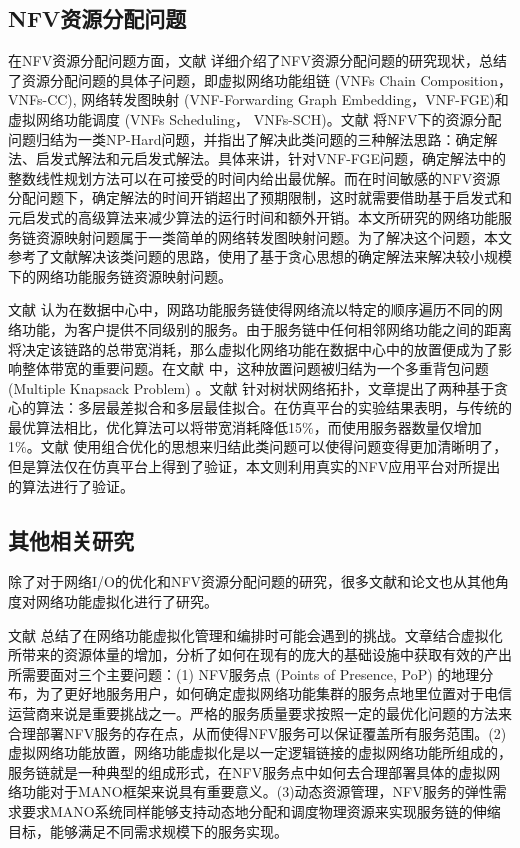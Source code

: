 \subsection{NFV资源分配问题}
在NFV资源分配问题方面，文献  详细介绍了NFV资源分配问题的研究现状，总结了资源分配问题的具体子问题，即虚拟网络功能组链 (VNFs Chain Composition，VNFs-CC), 网络转发图映射 (VNF-Forwarding Graph Embedding，VNF-FGE)和虚拟网络功能调度 (VNFs Scheduling， VNFs-SCH)。文献  将NFV下的资源分配问题归结为一类NP-Hard问题，并指出了解决此类问题的三种解法思路：确定解法、启发式解法和元启发式解法。具体来讲，针对VNF-FGE问题，确定解法中的整数线性规划方法可以在可接受的时间内给出最优解。而在时间敏感的NFV资源分配问题下，确定解法的时间开销超出了预期限制，这时就需要借助基于启发式和元启发式的高级算法来减少算法的运行时间和额外开销。本文所研究的网络功能服务链资源映射问题属于一类简单的网络转发图映射问题。为了解决这个问题，本文参考了文献解决该类问题的思路，使用了基于贪心思想的确定解法来解决较小规模下的网络功能服务链资源映射问题。

文献  认为在数据中心中，网路功能服务链使得网络流以特定的顺序遍历不同的网络功能，为客户提供不同级别的服务。由于服务链中任何相邻网络功能之间的距离将决定该链路的总带宽消耗，那么虚拟化网络功能在数据中心中的放置便成为了影响整体带宽的重要问题。在文献  中，这种放置问题被归结为一个多重背包问题 (Multiple Knapsack Problem) 。文献  针对树状网络拓扑，文章提出了两种基于贪心的算法：多层最差拟合和多层最佳拟合。在仿真平台的实验结果表明，与传统的最优算法相比，优化算法可以将带宽消耗降低15\%，而使用服务器数量仅增加1\%。文献  使用组合优化的思想来归结此类问题可以使得问题变得更加清晰明了，但是算法仅在仿真平台上得到了验证，本文则利用真实的NFV应用平台对所提出的算法进行了验证。

\subsection{其他相关研究}
除了对于网络I/O的优化和NFV资源分配问题的研究，很多文献和论文也从其他角度对网络功能虚拟化进行了研究。

文献  总结了在网络功能虚拟化管理和编排时可能会遇到的挑战。文章结合虚拟化所带来的资源体量的增加，分析了如何在现有的庞大的基础设施中获取有效的产出所需要面对三个主要问题：(1) NFV服务点 (Points of Presence, PoP) 的地理分布，为了更好地服务用户，如何确定虚拟网络功能集群的服务点地里位置对于电信运营商来说是重要挑战之一。严格的服务质量要求按照一定的最优化问题的方法来合理部署NFV服务的存在点，从而使得NFV服务可以保证覆盖所有服务范围。(2)虚拟网络功能放置，网络功能虚拟化是以一定逻辑链接的虚拟网络功能所组成的，服务链就是一种典型的组成形式，在NFV服务点中如何去合理部署具体的虚拟网络功能对于MANO框架来说具有重要意义。(3)动态资源管理，NFV服务的弹性需求要求MANO系统同样能够支持动态地分配和调度物理资源来实现服务链的伸缩目标，能够满足不同需求规模下的服务实现。

